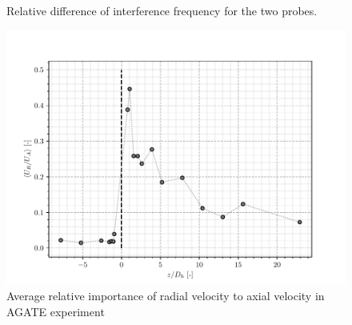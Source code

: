 \begin{figure}[!h]
\centering
{}

\caption{Relative difference of interference frequency for the two probes.}
\label{fig:exp_C52_deltanu}
\end{figure}


\begin{figure}[!h]
\centering
\includegraphics[width=0.5\linewidth]{img/AGATE/Urap_z.pdf}
\caption{Average relative importance of radial velocity to axial velocity in AGATE experiment}
\label{fig:exp_agate_Urap_z}
\end{figure}



